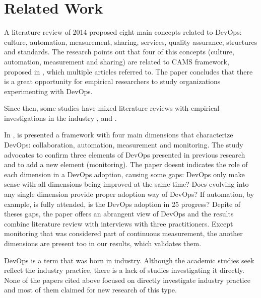 \section{Related Work}

A literature review of 2014 \cite{cooperation_dev_ops_esem_2014} proposed eight
main concepts related to DevOps: culture, automation, measurement, sharing,
services, quality assurance, structures and standards.
The research points out that four of this concepts (culture, automation,
measurement and sharing) are related to CAMS framework, proposed in
\cite{what_devops_means_2010}, which multiple articles referred to.
The paper concludes that there is a great opportunity for empirical researchers
to study organizations experimenting with DevOps.

Since then, some studies have mixed literature reviews with empirical
investigations in the industry \cite{devops_a_definition_xp_15},
\cite{a_qualitative_study_journal_sw_17} and \cite{dimensions_of_devops_xp_15}.

In \cite{dimensions_of_devops_xp_15}, is presented a framework with four main
dimensions that characterize DevOps: collaboration, automation, measurement and
monitoring. The study advocates to confirm three elements of DevOps presented
in previous research and to add a new element (monitoring). The paper doesnt
indicates the role of each dimension in a DevOps adoption, causing some gaps:
DevOps only make sense with all dimensions being improved at the same time?
Does evolving into any single dimension provide proper adoption way of DevOps?
If automation, by example, is fully attended, is the DevOps adoption in 25%
progress? Depite of theses gaps, the paper offers an abrangent view of DevOps
and the results combine literature review with interviews with three
practitioners. Except monitoring that was considered part of continuous
measurement, the another dimensions are present too in our results, which
validates them.


DevOps is a term that was born in industry. Although the academic studies seek
reflect the industry practice, there is a lack of studies investigating it
directly. None of the papers cited above focused on directly investigate
industry practice and most of them claimed for new research of this type.
